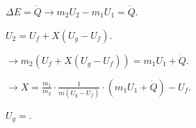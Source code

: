 \( \Delta E = \dot{Q} \rightarrow m_2U_2 - m_1U_1 = \dot{Q} \).  

\( U_2 = U_f + X(U_{g} - U_f) \).  

\( \rightarrow m_2(U_f + X(U_{g} - U_f)) = m_1U_1 + \dot{Q} \).  

\( \rightarrow X = \frac{m_1}{m_2} \cdot \frac{1}{m(U_{g} - U_f)} \cdot (m_1U_1 + \dot{Q}) - U_f \).  

\( U_g = \).